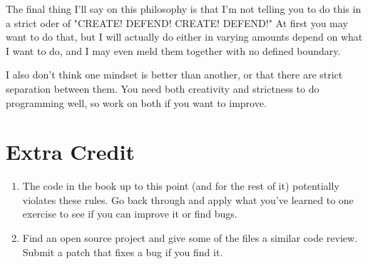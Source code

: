 The final thing I'll say on this philosophy is that I'm not telling you to do this in
a strict oder of "CREATE! DEFEND! CREATE! DEFEND!"  At first you may want to do that,
but I will actually do either in varying amounts depend on what I want to do, and I may
even meld them together with no defined boundary.

I also don't think one mindset is better than another, or that there are strict separation
between them.  You need both creativity and strictness to do programming well, so work
on both if you want to improve.


\section{Extra Credit}

\begin{enumerate}
\item The code in the book up to this point (and for the rest of it) potentially violates these rules.  Go back through and apply what you've learned to one 
    exercise to see if you can improve it or find bugs.
\item Find an open source project and give some of the files a similar code review.  Submit a patch that fixes a bug if you find it.
\end{enumerate}

